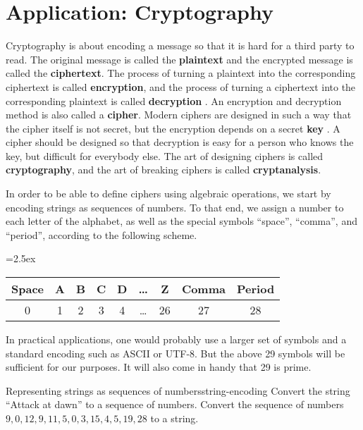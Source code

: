 \section{Application: Cryptography}

\begingroup
\newcommand{\qq}[1]{\mbox{#1}}
\newcommand{\q}[1]{\qq{``#1''}}

Cryptography is about encoding a message so that it is hard for a
third party to read. The original message is called the
\textbf{plaintext} and the
encrypted message is called the
\textbf{ciphertext}. The
process of turning a plaintext into the corresponding ciphertext is
called \textbf{encryption},
and the process of turning a ciphertext into the corresponding
plaintext is called \textbf{decryption}%
. An encryption and decryption method is also
called a \textbf{cipher}.  Modern ciphers are designed
in such a way that the cipher itself is not secret, but the encryption
depends on a secret \textbf{key}%
. A cipher should be designed so that decryption is
easy for a person who knows the key, but difficult for everybody
else. The art of designing ciphers is called
\textbf{cryptography}, and the art of breaking
ciphers is called \textbf{cryptanalysis}.

In order to be able to define ciphers using algebraic operations, we
start by encoding strings as sequences of numbers. To that end, we
assign a number to each letter of the alphabet, as well as the special
symbols ``space'', ``comma'', and ``period'', according to the
following scheme.
\begin{center}
  \tabcolsep=2.5ex
  \begin{tabular}{|c|c|c|c|c|c|c|c|c|}
    \hline
    Space & A & B & C & D & \ldots & Z & Comma & Period \\\hline
    0 & 1 & 2 & 3 & 4 & \ldots & 26 & 27 & 28 \\\hline
  \end{tabular}
\end{center}
In practical applications, one would probably use a larger set of
symbols and a standard encoding such as ASCII or UTF-8. But the above
29 symbols will be sufficient for our purposes. It will also come in
handy that 29 is prime.

\begin{example}{Representing strings as sequences of numbers}{string-encoding}
  Convert the string ``Attack at dawn'' to a sequence of
  numbers. Convert the sequence of numbers
  $9,0,12,9,11,5,0,3,15,4,5,19,28$ to a string.
\end{example}


